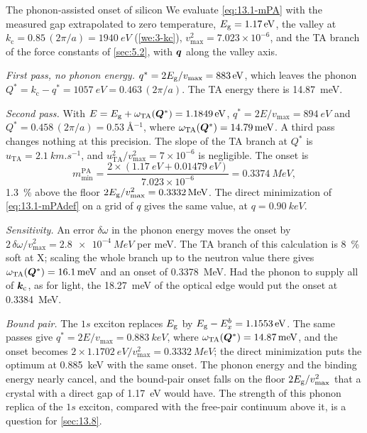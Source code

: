 \begin{workedexample}{The phonon-assisted onset of silicon}\label{we:13-onset}
We evaluate \cref{eq:13.1-mPA} with the measured gap extrapolated to zero temperature, $E_{\mathrm{g}} = \SI{1.17}{eV}$, the valley at $k_{\mathrm{c}} = 0.85\,(2\pi/a) = \SI{1940}{eV}$ (\cref{we:3-kc}), $v_{\mathrm{max}}^2 = 7.023\times10^{-6}$, and the TA branch of the force constants of \cref{sec:5.2}, with $\bm{q}$ along the valley axis.

\emph{First pass, no phonon energy.} $q^* = 2E_{\mathrm{g}}/v_{\mathrm{max}} = \SI{883}{eV}$, which leaves the phonon $Q^* = k_{\mathrm{c}} - q^* = \SI{1057}{eV} = 0.463\,(2\pi/a)$. The TA energy there is \SI{14.87}{meV}.

\emph{Second pass.} With $E = E_{\mathrm{g}} + \omega_{\mathrm{TA}}(\bm{Q}^*) = \SI{1.1849}{eV}$, $q^* = 2E/v_{\mathrm{max}} = \SI{894}{eV}$ and $Q^* = 0.458\,(2\pi/a) = \SI{0.53}{\angstrom^{-1}}$, where $\omega_{\mathrm{TA}}(\bm{Q}^*) = \SI{14.79}{meV}$. A third pass changes nothing at this precision. The slope of the TA branch at $Q^*$ is $u_{\mathrm{TA}} = \SI{2.1}{km.s^{-1}}$, and $u_{\mathrm{TA}}^2/v_{\mathrm{max}}^2 = 7\times10^{-6}$ is negligible. The onset is
\begin{equation*}
  m_{\mathrm{min}}^{\mathrm{PA}} = \frac{2\times(\SI{1.17}{eV} + \SI{0.01479}{eV})}{7.023\times10^{-6}} = \SI{0.3374}{MeV} ,
\end{equation*}
\SI{1.3}{\percent} above the floor $2E_{\mathrm{g}}/v_{\mathrm{max}}^2 = \SI{0.3332}{MeV}$. The direct minimization of \cref{eq:13.1-mPAdef} on a grid of $q$ gives the same value, at $q = \SI{0.90}{keV}$.

\emph{Sensitivity.} An error $\delta\omega$ in the phonon energy moves the onset by $2\,\delta\omega/v_{\mathrm{max}}^2 = \SI{2.8e-4}{MeV}$ per meV. The TA branch of this calculation is \SI{8}{\percent} soft at X; scaling the whole branch up to the neutron value there gives $\omega_{\mathrm{TA}}(\bm{Q}^*) = \SI{16.1}{meV}$ and an onset of \SI{0.3378}{MeV}. Had the phonon to supply all of $\bm{k}_{\mathrm{c}}$, as for light, the \SI{18.27}{meV} of the optical edge would put the onset at \SI{0.3384}{MeV}.

\emph{Bound pair.} The $1s$ exciton replaces $E_{\mathrm{g}}$ by $E_{\mathrm{g}} - E_x^b = \SI{1.1553}{eV}$. The same passes give $q^* = 2E/v_{\mathrm{max}} = \SI{0.883}{keV}$, where $\omega_{\mathrm{TA}}(\bm{Q}^*) = \SI{14.87}{meV}$, and the onset becomes $2\times\SI{1.1702}{eV}/v_{\mathrm{max}}^2 = \SI{0.3332}{MeV}$; the direct minimization puts the optimum at \SI{0.885}{keV} with the same onset. The phonon energy and the binding energy nearly cancel, and the bound-pair onset falls on the floor $2E_{\mathrm{g}}/v_{\mathrm{max}}^2$ that a crystal with a direct gap of \SI{1.17}{eV} would have. The strength of this phonon replica of the $1s$ exciton, compared with the free-pair continuum above it, is a question for \cref{sec:13.8}.
\end{workedexample}

